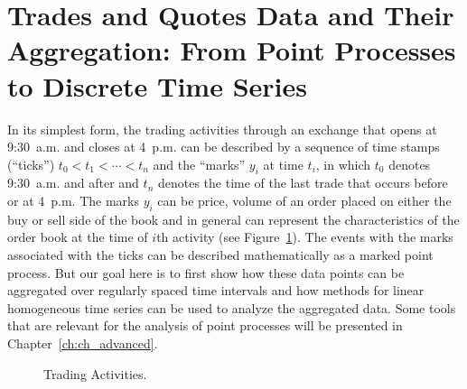 \section{Trades and Quotes Data and Their Aggregation: From Point Processes to Discrete Time Series\label{sec:tradesandquotes}}

In its simplest form, the trading activities through an exchange that opens at 9:30~a.m. and closes at 4~p.m. can be described by a sequence of time stamps (``ticks'') $t_0 < t_1 < \cdots < t_n$ and the ``marks'' $y_i$ at time $t_i$, in which $t_0$ denotes 9:30~a.m. and after and $t_n$ denotes the time of the last trade that occurs before or at 4~p.m. The marks $y_i$ can be price, volume of an order placed on either the buy or sell side of the book and in general can represent the characteristics of the order book at the time of $i$th activity (see Figure~\ref{fig:tradeactline}). The events with the marks associated with the ticks can be described mathematically as a marked point process. But our goal here is to first show how these data points can be aggregated over regularly spaced time intervals and how methods for linear homogeneous time series can be used to analyze the aggregated data. Some tools that are relevant for the analysis of point processes will be presented in Chapter~\ref{ch:ch_advanced}. \label{in:disc_time_unit1} \label{in:level3dat2}
	\begin{figure}[!ht]
	\centering
	\caption{Trading Activities. \label{fig:tradeactline}}
	\end{figure}


